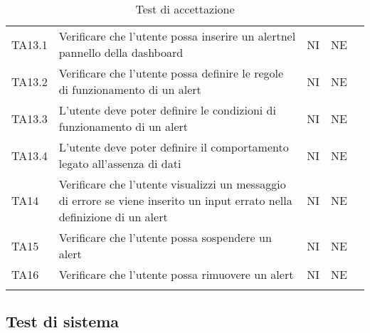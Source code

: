 \begin{longtable} {
		>{}p{15mm} 
		>{}p{79.5mm}
		>{}p{15mm} 
		>{}p{15mm}
		>{}p{0mm}}
	TA13.1	& Verificare che l'utente possa inserire un alert\glosp nel pannello della dashboard\glo & NI & NE  &\TBstrut \\ [2mm]
	TA13.2	& Verificare che l'utente possa definire le regole di funzionamento di un alert\glo & NI & NE  &\TBstrut \\ [2mm]
	TA13.3	& L'utente deve poter definire le condizioni di funzionamento di un alert\glo & NI & NE  &\TBstrut \\ [2mm]
	TA13.4	& L'utente deve poter definire il comportamento legato all'assenza di dati  & NI & NE  &\TBstrut \\ [2mm]
	TA14	& Verificare che l'utente visualizzi un messaggio di errore se viene inserito un input errato nella definizione di un alert\glo & NI & NE  &\TBstrut \\ [2mm]
	TA15	& Verificare che l'utente possa sospendere un alert\glo & NI & NE  &\TBstrut \\ [2mm]
	TA16	& Verificare che l'utente possa rimuovere un alert\glo & NI & NE  &\TBstrut \\ [2mm]
	\rowcolor{white}
	\caption{Test di accettazione}
\end{longtable}


\subsection{Test di sistema}

